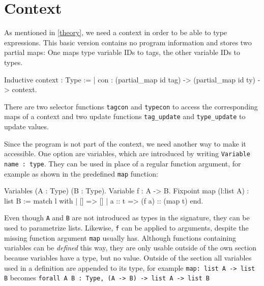 \documentclass[fleqn]{scrreprt}
\newcommand{\coqinline}[1]{\texttt{#1}}
\begin{document}
\section{Context}
As mentioned in \autoref{theory}, we need a context in order to be able to type expressions. This basic version contains no program information and stores two partial maps: One maps type variable IDs to tags, the other variable IDs to types. 
\begin{coqcode}
Inductive context : Type := 
| con : (partial_map id tag) -> (partial_map id ty) -> context.
\end{coqcode}
There are two selector functions \coqinline{tagcon} and \coqinline{typecon} to access the corresponding maps of a context and two update functions \coqinline{tag_update} and \coqinline{type_update} to update values.
\par
Since the program is not part of the context, we need another way to make it accessible. One option are variables, which are introduced by writing \coqinline{Variable name : type}. They can be used in place of a regular function argument, for example as shown in the predefined \coqinline{map} function:
\begin{coqcode}
Variables (A : Type) (B : Type).
Variable f : A -> B.
Fixpoint map (l:list A) : list B :=
  match l with
  | [] => []
  | a :: t => (f a) :: (map t)
  end.
\end{coqcode}
Even though \coqinline{A} and \coqinline{B} are not introduced as types in the signature, they can be used to parametrize lists. Likewise, \coqinline{f} can be applied to arguments, despite the missing function argument \coqinline{map} usually has. Although functions containing variables can be \textit{defined} this way, they are only usable outside of the own section because variables have a type, but no value. Outside of the section all variables used in a definition are appended to its type, for example \coqinline{map: list A -> list B} becomes \coqinline{forall A B : Type, (A -> B) -> list A -> list B}
\end{document}
